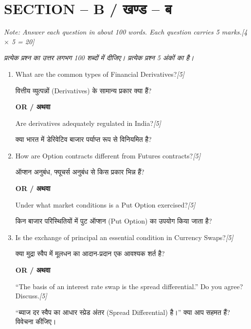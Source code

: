 \documentclass[11pt,a4paper]{article}
\newcommand{\pts}[1]{\hfill \textit{[#1]}}
\begin{document}
\bigskip

\section*{SECTION -- B / खण्ड -- ब}
\noindent \textit{Note: Answer each question in about 100 words. Each question carries 5 marks.}\pts{4 $\times$ 5 = 20}

\noindent \textit{प्रत्येक प्रश्न का उत्तर लगभग 100 शब्दों में दीजिए। प्रत्येक प्रश्न 5 अंकों का है।}

\begin{enumerate}[label=\textbf{\arabic*.},leftmargin=*,start=2,itemsep=12pt]

  \item What are the common types of Financial Derivatives?\pts{5}
  
  वित्तीय व्युत्पन्नों (Derivatives) के सामान्य प्रकार क्या हैं?

  \begin{center}\textbf{OR / अथवा}\end{center}

  Are derivatives adequately regulated in India?\pts{5}
  
  क्या भारत में डेरिवेटिव बाजार पर्याप्त रूप से विनियमित है?

  \item How are Option contracts different from Futures contracts?\pts{5}
  
  ऑप्शन अनुबंध, फ्यूचर्स अनुबंध से किस प्रकार भिन्न हैं?

  \begin{center}\textbf{OR / अथवा}\end{center}

  Under what market conditions is a Put Option exercised?\pts{5}
  
  किन बाजार परिस्थितियों में पुट ऑप्शन (Put Option) का उपयोग किया जाता है?

  \item Is the exchange of principal an essential condition in Currency Swaps?\pts{5}
  
  क्या मुद्रा स्वैप में मूलधन का आदान-प्रदान एक आवश्यक शर्त है?

  \begin{center}\textbf{OR / अथवा}\end{center}

  ``The basis of an interest rate swap is the spread differential.'' Do you agree? Discuss.\pts{5}
  
  ``ब्याज दर स्वैप का आधार स्प्रेड अंतर (Spread Differential) है।'' क्या आप सहमत हैं? विवेचना कीजिए।


\end{enumerate}
\end{document}
